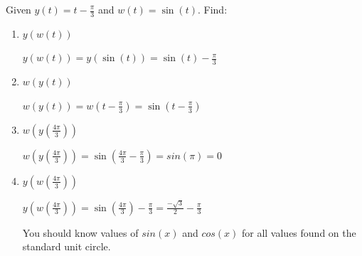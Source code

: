 \documentclass[nooutcomes]{ximera}
\begin{document}
\begin{problem}
Given $y(t)=t- \frac{\pi}{3}$ and $w(t)=\sin(t)$.  Find:
\begin{enumerate}	
	\item  $y(w(t))$
		\begin{freeResponse}
			$y(w(t))=y\left( \sin(t) \right)=\sin(t)-\frac{\pi}{3}$
		\end{freeResponse}	


	\item  $w(y(t))$
		\begin{freeResponse}
		$w(y(t))=w\left( t-\frac{\pi}{3}\right)=\sin\left( t-\frac{\pi}{3}\right)$
		\end{freeResponse}	


	\item  $w \left(y \left(\frac{4\pi}{3} \right)\right)$
		\begin{freeResponse}
		$w \left(y \left(\frac{4\pi}{3} \right)\right)=\sin \left(\frac{4\pi}{3}-\frac{\pi}{3}\right)=sin(\pi)=0$
		\end{freeResponse}	


	\item  $y(w(\frac{4\pi}{3}))$
		\begin{freeResponse}
		$y \left(w \left(\frac{4\pi}{3} \right)\right)=\sin \left(\frac{4\pi}{3}\right)-\frac{\pi}{3}=\frac{-\sqrt{3}}{2}-\frac{\pi}{3}$

		You should know values of $sin(x)$ and $cos(x)$ for all values found on the standard unit circle.
		\end{freeResponse}	
	
	\end{enumerate}
	
	
\end{problem}
\end{document}
